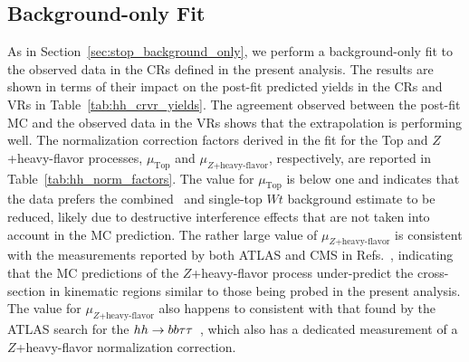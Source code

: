 \FloatBarrier
\subsection{Background-only Fit}
\label{sec:hh_bkg_only}

As in Section~\ref{sec:stop_background_only}, we perform a background-only fit to
the observed data in the CRs defined in the present analysis.
The results are shown in terms of their impact on the post-fit predicted yields
in the CRs and VRs in Table~\ref{tab:hh_crvr_yields}.
The agreement observed between the post-fit MC and the observed data in the VRs
shows that the extrapolation is performing well.
The normalization correction factors derived in the fit for the Top and $Z$+heavy-flavor processes,
$\mu_{\text{Top}}$ and $\mu_{Z\text{+heavy-flavor}}$, respectively,
are reported in Table~\ref{tab:hh_norm_factors}.
The value for $\mu_{\text{Top}}$ is below one and indicates that the data prefers the combined \ttbar~and
single-top $Wt$ background estimate to be reduced, likely due to destructive interference effects
that are not taken into account in the MC prediction.
The rather large value of $\mu_{Z\text{+heavy-flavor}}$ is consistent with the measurements
reported by both ATLAS and CMS in Refs.~\cite{Chatrchyan:2013zja,Aad:2014dvb}, indicating that the MC
predictions of the $Z$+heavy-flavor process under-predict the cross-section in kinematic regions similar
to those being probed in the present analysis.
The value for $\mu_{Z\text{+heavy-flavor}}$ also happens to consistent with that found by the ATLAS search for the $hh \rightarrow bb\tau\tau$~\cite{HHBBTAUTAU},
which also has a dedicated measurement of a $Z$+heavy-flavor normalization correction. 

